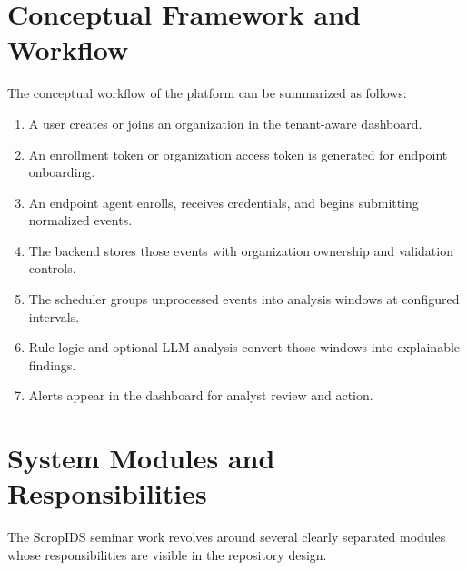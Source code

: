\documentclass[12pt,a4paper]{report}
\begin{document}
\section{Conceptual Framework and Workflow}
The conceptual workflow of the platform can be summarized as follows:
\begin{enumerate}
    \item A user creates or joins an organization in the tenant-aware dashboard.
    \item An enrollment token or organization access token is generated for endpoint onboarding.
    \item An endpoint agent enrolls, receives credentials, and begins submitting normalized events.
    \item The backend stores those events with organization ownership and validation controls.
    \item The scheduler groups unprocessed events into analysis windows at configured intervals.
    \item Rule logic and optional LLM analysis convert those windows into explainable findings.
    \item Alerts appear in the dashboard for analyst review and action.
\end{enumerate}

\begin{center}
\end{center}

\section{System Modules and Responsibilities}
The ScropIDS seminar work revolves around several clearly separated modules whose responsibilities are visible in the repository design.
\end{document}
